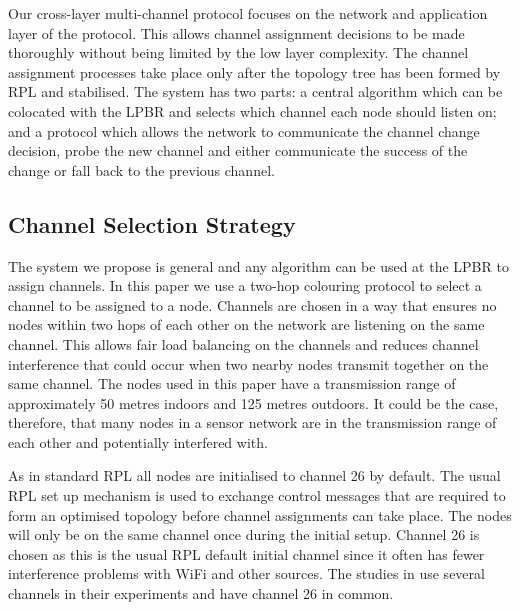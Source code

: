 Our cross-layer multi-channel protocol focuses on the network and application layer of the protocol. This allows channel assignment decisions to be made thoroughly without being limited by the low layer complexity. The channel assignment processes take place only after the topology tree has been formed by RPL and stabilised.  The system
has two parts: a central algorithm which can be colocated with the LPBR and selects which channel each node should listen on; and a protocol which allows the network to communicate the channel change decision, probe the new channel and either communicate the success of the change or fall back to the previous channel. 



\subsection{Channel Selection Strategy}

The system we propose is general and any algorithm can be used at the LPBR to assign channels.  In this paper we
use a two-hop colouring protocol to select a channel to be assigned to a node.  Channels are chosen in a way that
ensures no nodes within two hops of each other on the network are listening on the same channel.
This allows fair load balancing on the channels and reduces channel interference that could occur when two nearby nodes transmit together on the same channel. The nodes used in this paper have a transmission range of approximately 50 metres indoors and 125 metres outdoors.  It could be the case, therefore, that many nodes in a sensor network are in the transmission range of each other and potentially interfered with.

As in standard RPL all nodes are initialised to channel 26 by default.  The usual RPL set up mechanism is used to exchange control messages that are required to form an optimised topology before channel assignments can take place. The nodes will only be on the same channel once during the initial setup. Channel 26 is chosen as this is the usual RPL default initial channel since it often has fewer interference problems with WiFi and other sources. The studies in \cite{chrysso}\cite{micmac}\cite{watteyne} use several channels in their experiments and have channel 26 in common.
	
